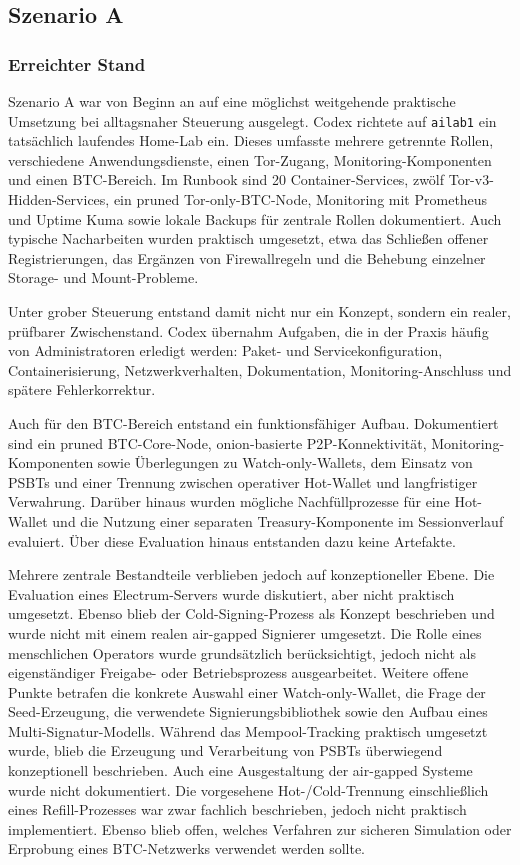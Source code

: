 \subsection{Szenario A}

\subsubsection{Erreichter Stand}

Szenario A war von Beginn an auf eine möglichst weitgehende praktische Umsetzung bei alltagsnaher Steuerung ausgelegt. Codex richtete auf \texttt{ailab1} ein tatsächlich laufendes Home-Lab ein. Dieses umfasste mehrere getrennte Rollen, verschiedene Anwendungsdienste, einen Tor-Zugang, Monitoring-Komponenten und einen \ac{BTC}-Bereich. Im Runbook sind 20 Container-Services, zwölf Tor-v3-Hidden-Services, ein pruned Tor-only-\ac{BTC}-Node, Monitoring mit Prometheus und Uptime Kuma sowie lokale Backups für zentrale Rollen dokumentiert. Auch typische Nacharbeiten wurden praktisch umgesetzt, etwa das Schließen offener Registrierungen, das Ergänzen von Firewallregeln und die Behebung einzelner Storage- und Mount-Probleme.

Unter grober Steuerung entstand damit nicht nur ein Konzept, sondern ein realer, prüfbarer Zwischenstand. Codex übernahm Aufgaben, die in der Praxis häufig von Administratoren erledigt werden: Paket- und Servicekonfiguration, Containerisierung, Netzwerkverhalten, Dokumentation, Monitoring-Anschluss und spätere Fehlerkorrektur.

Auch für den \ac{BTC}-Bereich entstand ein funktionsfähiger Aufbau. Dokumentiert sind ein pruned \ac{BTC}-Core-Node, onion-basierte \ac{P2P}-Konnektivität, Monitoring-Komponenten sowie Überlegungen zu Watch-only-Wallets, dem Einsatz von \acp{PSBT} und einer Trennung zwischen operativer Hot-Wallet und langfristiger Verwahrung. 
Darüber hinaus wurden mögliche Nachfüllprozesse für eine Hot-Wallet und die Nutzung einer separaten Treasury-Komponente im Sessionverlauf evaluiert. Über diese Evaluation hinaus entstanden dazu keine Artefakte.

Mehrere zentrale Bestandteile verblieben jedoch auf konzeptioneller Ebene. Die Evaluation eines Electrum-Servers wurde diskutiert, aber nicht praktisch umgesetzt. Ebenso blieb der Cold-Signing-Prozess als Konzept beschrieben und wurde nicht mit einem realen air-gapped Signierer umgesetzt. 
Die Rolle eines menschlichen Operators wurde grundsätzlich berücksichtigt, jedoch nicht als eigenständiger Freigabe- oder Betriebsprozess ausgearbeitet. Weitere offene Punkte betrafen die konkrete Auswahl einer Watch-only-Wallet, die Frage der Seed-Erzeugung, die verwendete Signierungsbibliothek sowie den Aufbau eines Multi-Signatur-Modells. Während das Mempool-Tracking praktisch umgesetzt wurde, blieb die Erzeugung und Verarbeitung von \acp{PSBT} überwiegend konzeptionell beschrieben. 
Auch eine Ausgestaltung der air-gapped Systeme wurde nicht dokumentiert. Die vorgesehene Hot-/Cold-Trennung einschließlich eines Refill-Prozesses war zwar fachlich beschrieben, jedoch nicht praktisch implementiert. 
Ebenso blieb offen, welches Verfahren zur sicheren Simulation oder Erprobung eines \ac{BTC}-Netzwerks verwendet werden sollte.


